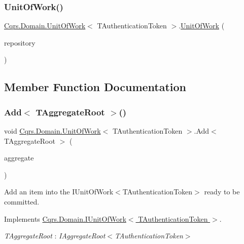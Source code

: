 \subsubsection{\texorpdfstring{Unit\+Of\+Work()}{UnitOfWork()}}
{\footnotesize\ttfamily \hyperlink{classCqrs_1_1Domain_1_1UnitOfWork}{Cqrs.\+Domain.\+Unit\+Of\+Work}$<$ T\+Authentication\+Token $>$.\hyperlink{classCqrs_1_1Domain_1_1UnitOfWork}{Unit\+Of\+Work} (\begin{DoxyParamCaption}\item[{\hyperlink{interfaceCqrs_1_1Domain_1_1IRepository}{I\+Repository}$<$ T\+Authentication\+Token $>$}]{repository }\end{DoxyParamCaption})}



\subsection{Member Function Documentation}
\mbox{\label{classCqrs_1_1Domain_1_1UnitOfWork_a840214f97d3661c7b5a739df65fadc9f}} 
\subsubsection{\texorpdfstring{Add$<$ T\+Aggregate\+Root $>$()}{Add< TAggregateRoot >()}}
{\footnotesize\ttfamily void \hyperlink{classCqrs_1_1Domain_1_1UnitOfWork}{Cqrs.\+Domain.\+Unit\+Of\+Work}$<$ T\+Authentication\+Token $>$.Add$<$ T\+Aggregate\+Root $>$ (\begin{DoxyParamCaption}\item[{T\+Aggregate\+Root}]{aggregate }\end{DoxyParamCaption})}



Add an item into the I\+Unit\+Of\+Work$<$\+T\+Authentication\+Token$>$ ready to be committed. 



Implements \hyperlink{interfaceCqrs_1_1Domain_1_1IUnitOfWork_a786ebca85b4ef7294b98280230ef1397}{Cqrs.\+Domain.\+I\+Unit\+Of\+Work$<$ T\+Authentication\+Token $>$}.

\begin{Desc}
\item[Type Constraints]\begin{description}
\item[{\em T\+Aggregate\+Root} : {\em I\+Aggregate\+Root$<$T\+Authentication\+Token$>$}]\end{description}
\end{Desc}
\mbox{\label{classCqrs_1_1Domain_1_1UnitOfWork_a7401e41dd8ce4457551c252ca6402d31}} 
